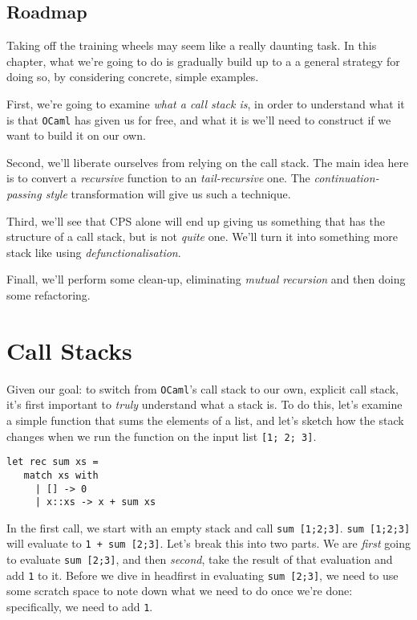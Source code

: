 \subsection{Roadmap}
Taking off the training wheels may seem like a really daunting task. In this chapter, what we're going to do is gradually build up to a  a general strategy for doing so, by considering concrete, simple examples.

First, we're going to examine \emph{what a call stack is}, in order to understand what it is that \texttt{OCaml} has given us for free, and what it is we'll need to construct if we want to build it on our own.

Second, we'll liberate ourselves from relying on the call stack. The main idea here is to convert a \emph{recursive} function to an \emph{tail-recursive} one. The \emph{continuation-passing style} transformation will give us such a technique.

Third, we'll see that CPS alone will end up giving us something that has the structure of a call stack, but is not \emph{quite} one. We'll turn it into something more stack like using \emph{defunctionalisation}. 

Finall, we'll perform some clean-up, eliminating \emph{mutual recursion} and then doing some refactoring. 



\section{Call Stacks}\label{section:call-stacks}
Given our goal: to switch from \texttt{OCaml}'s call stack to our own, explicit call stack, it's first important to \emph{truly} understand what a stack is. To do this, let's examine a simple function that sums the elements of a list, and let's sketch how the stack changes when we run the function on the input list \texttt{[1; 2; 3]}.

\begin{code}
\label{code:sum-ocaml}
\begin{verbatim}
let rec sum xs = 
   match xs with
     | [] -> 0
     | x::xs -> x + sum xs
\end{verbatim}
\end{code}

In the first call, we start with an empty stack and call \texttt{sum [1;2;3]}. \texttt{sum [1;2;3]} will evaluate to \texttt{1 + sum [2;3]}. Let's break this into two parts. We are \emph{first} going to evaluate \texttt{sum [2;3]}, and then \emph{second}, take the result of that evaluation and add \texttt{1} to it. Before we dive in headfirst in evaluating \texttt{sum [2;3]}, we need to use some scratch space to note down what we need to do once we're done: specifically, we need to add \texttt{1}. 

